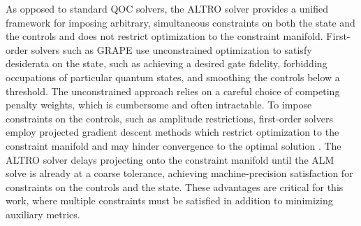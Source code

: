 As opposed to standard QOC solvers, the ALTRO solver provides a unified framework
for imposing arbitrary, simultaneous constraints
on both the state and the controls and does not restrict
optimization to the constraint manifold. First-order solvers such as GRAPE
use unconstrained optimization to satisfy desiderata on the state,
such as achieving a desired gate fidelity, forbidding occupations of particular quantum states,
and smoothing the controls below a threshold. The unconstrained approach relies
on a careful choice of competing penalty weights, which is cumbersome and often intractable.
To impose constraints on the controls, such as amplitude restrictions, first-order solvers
employ projected gradient descent methods which restrict optimization to the constraint manifold and
may hinder convergence to the optimal solution \cite{clarkson2010coresets,
  hauswirth2016projected}.
The ALTRO solver delays projecting onto the constraint manifold until the ALM
solve is already at a coarse tolerance, achieving machine-precision satisfaction
for constraints on the controls and the state. These advantages are critical
for this work, where multiple constraints must be satisfied in addition
to minimizing auxiliary metrics.


